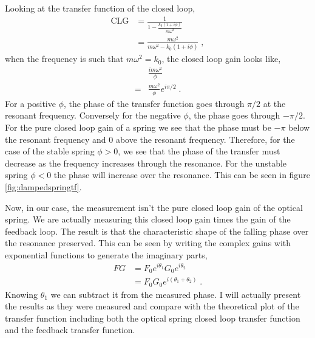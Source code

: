 Looking at the transfer function of the closed loop,
\begin{align}
\mathrm{CLG} &= \frac{1}{1-\frac{k_0(1+i\phi)}{m\omega^2}} \nonumber \\
  &= \frac{m\omega^2}{m\omega^2-k_0(1+i\phi)} \;,
\end{align}
when the frequency is such that $m\omega^2 = k_0$,
the closed loop gain looks like,
\begin{align}
&\frac{im\omega^2}{\phi} \nonumber \\
=&\frac{m\omega^2}{\phi}e^{i\pi/2} \;.
\end{align}
For a positive $\phi$, the phase of the transfer function goes through $\pi/2$
at the resonant frequency.
Conversely for the negative $\phi$, the phase goes through $-\pi/2$.
For the pure closed loop gain of a spring we see that the phase must be $-\pi$
below the resonant frequency and $0$ above the resonant frequency.
Therefore, for the case of the stable spring $\phi>0$, we see that the phase of
the transfer must decrease as the frequency increases through the resonance.
For the unstable spring $\phi<0$ the phase will increase over the resonance.
This can be seen in figure \ref{fig:dampedspringtf}.

Now, in our case, the measurement isn't the pure closed loop gain of the
optical spring.
We are actually measuring this closed loop gain times the gain of the feedback
loop.
The result is that the characteristic shape of the falling phase over the
resonance preserved.
This can be seen by writing the complex gains with exponential functions to
generate the imaginary parts,
\begin{align}
FG &= F_0e^{i\theta_1}G_0e^{i\theta_2} \nonumber \\
  &= F_0G_0e^{i(\theta_1+\theta_2)} \;.
\end{align}
Knowing $\theta_1$ we can subtract it from the measured phase. I will actually
present the results as they were measured and compare with the
theoretical plot of the transfer function including both the optical spring
closed loop transfer function and the feedback transfer function.

